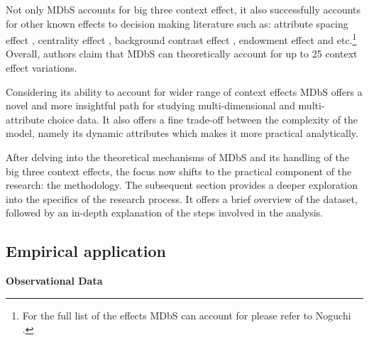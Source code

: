 \documentclass[a4paper,12pt]{article}
\newcommand{\citeyearonly}[1]{\citeyearpar{#1}}
\begin{document}
Not only MDbS accounts for big three context effect, it also successfully accounts for other known effects to decision making literature such as: attribute spacing effect \citep{cooke1998multiattribute}, centrality effect \citep{brown2011decision}, background contrast effect \citep{tverskySimonson93}, endowment effect \citep{knetsch1989endowment} and etc.\footnote{For the full list of the effects MDbS can account for please refer to Noguchi \citeyearonly{noguchi2018multialternative}.} Overall, authors claim that MDbS can theoretically account for up to 25 context effect variations. 

Considering its ability to account for wider range of context effects MDbS offers a novel and more insightful path for studying multi-dimensional and multi-attribute choice data. It also offers a fine trade-off between the complexity of the model, namely its dynamic attributes which makes it more practical analytically. 

After delving into the theoretical mechanisms of MDbS and its handling of the big three context effects, the focus now shifts to the practical component of the research: the methodology. The subsequent section provides a deeper exploration into the specifics of the research process. It offers a brief overview of the dataset, followed by an in-depth explanation of the steps involved in the analysis.

\subsection{Empirical application}

\textbf{Observational Data}\label{section:observationalDataDescription}
\end{document}
